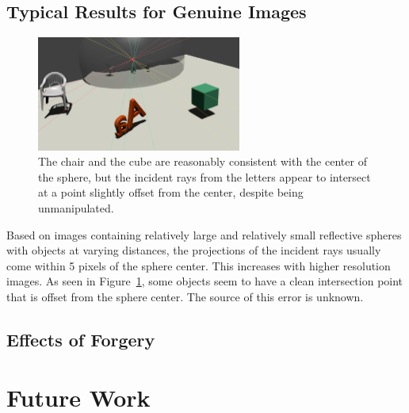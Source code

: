 \documentclass{thesis}
\begin{document}

\section{Typical Results for Genuine Images}
\begin{figure}
	\centering
    	\includegraphics[width=0.6\textwidth]{1b-genuine}
	\caption{The chair and the cube are reasonably consistent with the center of the sphere, but the incident rays from the letters appear to intersect at a point slightly offset from the center, despite being unmanipulated.}
	\label{1b-genuine}
\end{figure}
Based on images containing relatively large and relatively small reflective spheres with objects at varying distances, the projections of the incident rays usually come within 5 pixels of the sphere center. This increases with higher resolution images. As seen in Figure~\ref{1b-genuine}, some objects seem to have a clean intersection point that is offset from the sphere center. The source of this error is unknown.



\section{Effects of Forgery}



\chapter{Future Work}

\clearpage

\appendix
%


\end{document}
